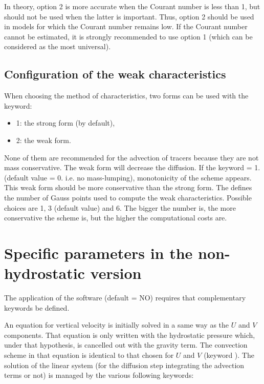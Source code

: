 In theory, option 2 is more accurate when the Courant number is less than 1,
but should not be used when the latter is important. Thus, option 2 should be
used in models for which the Courant number remains low. If the Courant number
cannot be estimated, it is strongly recommended to use option 1 (which can be
considered as the most universal).

\subsection{Configuration of the weak characteristics}

When choosing the method of characteristics, two forms can be used with the
keyword:

\begin{itemize}
\item 1: the strong form (by default),

\item 2: the weak form.
\end{itemize}

None of them are recommended for the advection of tracers because they are not
mass conservative. The weak form will decrease the diffusion. If the keyword
 = 1. (default value = 0. i.e. no
mass-lumping), monotonicity of the scheme appears. This weak form should be
more conservative than the strong form. The  defines the number of Gauss points used to compute the
weak characteristics. Possible choices are 1, 3 (default value) and 6. The
bigger the number is, the more conservative the scheme is, but the higher the
computational costs are.


\section{Specific parameters in the non-hydrostatic version}

The application of the software  (default = NO)
requires that complementary keywords be defined.

An equation for vertical velocity is initially solved in a same way as the
$U$ and $V$ components. That equation is only written with the
hydrostatic pressure which, under that hypothesis, is cancelled out with the
gravity term. The convection scheme in that equation is identical to that
chosen for $U$ and $V$ (keyword ). The solution of the linear system (for the diffusion step
integrating the advection terms or not) is managed by the various following
keywords:

